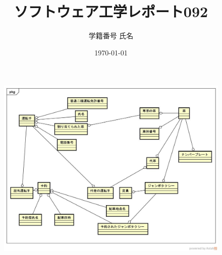 \documentclass[a4paper]{jarticle}
\title{ソフトウェア工学レポート092}
\author{学籍番号 氏名}
\date{\today}
\begin{document}
\maketitle
\begin{figure}[H]
 \begin{center}
  \includegraphics[width=170truemm]{DomainModel.jpg}
 \end{center}
\end{figure}
\end{document}

